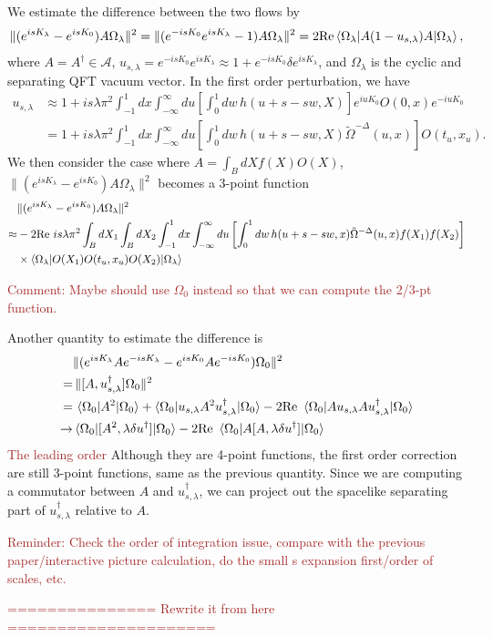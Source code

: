 \documentclass[a4paper,11pt]{article}
\theoremstyle{definition}
\newcommand{\KL}[1]{\textcolor{brown}{#1}}
\begin{document}
We estimate the difference between the two flows by
\begin{align}
    \lVert(e^{isK_\lambda} - e^{isK_0}) A\Omega_\lambda \rVert^2 = \lVert(e^{-isK_0}e^{isK_\lambda} - 1) A\Omega_\lambda \rVert^2 = 2 \text{Re}\braket{\Omega_\lambda|A(1-u_{s,\lambda})A|\Omega_\lambda},
\end{align}
where $A=A^\dagger \in \mathcal{A}$, $u_{s,\lambda} = e^{-isK_0}e^{isK_\lambda} \approx 1 + e^{-isK_0}\delta e^{isK_\lambda}$, and $\Omega_\lambda$ is the cyclic and separating QFT vacuum vector. In the first order perturbation, we have
\begin{align}
    u_{s,\lambda} &\approx 1 + is\lambda\pi^2 \int_{-1}^1 dx \int_{-\infty}^{\infty} du \left[\int_0^1 dw \, h(u+s-sw,X)\right] e^{iuK_0} O(0,x)  e^{-iuK_0}\\
    &=1+ is\lambda\pi^2 \int_{-1}^1 dx \int_{-\infty}^{\infty} du \left[\int_0^1 dw \, h(u+s-sw,X) \tilde{\Omega}^{-\Delta}(u,x) \right] O(t_u,x_u) .
\end{align}
We then consider the case where $A = \int_{B}dX f(X) O(X)$, $\lVert(e^{isK_\lambda} - e^{isK_0}) A\Omega_\lambda \rVert^2$ becomes a 3-point function
\begin{align}
    &\lVert(e^{isK_\lambda} - e^{isK_0}) A\Omega_\lambda \rVert^2\\ 
    \approx&  -2 \text{Re } is\lambda\pi^2 \int_{B}dX_1\int_{B}dX_2\int_{-1}^1 dx \int_{-\infty}^{\infty} du \left[\int_0^1 dw \, h(u+s-sw,x) \tilde{\Omega}^{-\Delta}(u,x) f(X_1)f(X_2) \right] \nonumber\\
    &\times \braket{\Omega_\lambda|O(X_1) O(t_u,x_u) O(X_2)|\Omega_\lambda}
\end{align}

\KL{Comment: Maybe should use $\Omega_0$ instead so that we can compute the 2/3-pt function.}

Another quantity to estimate the difference is
\begin{align}
    &\lVert(e^{isK_\lambda}Ae^{-isK_\lambda} - e^{isK_0} A e^{-isK_0})\Omega_0 \rVert^2 \\
    =&\, \lVert [A, u_{s,\lambda}^\dagger]\Omega_0 \rVert^2 \\
    =&\, \braket{\Omega_0|A^2|\Omega_0} + \braket{\Omega_0|u_{s,\lambda} A^2 u_{s,\lambda}^\dagger|\Omega_0} - 2\text{Re }\braket{\Omega_0|A u_{s,\lambda} A u_{s,\lambda}^\dagger|\Omega_0}\\
    \to &\braket{\Omega_0|[A^2, \lambda\delta u^\dagger]|\Omega_0} - 2\text{Re }\braket{\Omega_0|A[A, \lambda \delta u^\dagger]|\Omega_0}
\end{align}
\KL{The leading order}
Although they are 4-point functions, the first order correction are still 3-point functions, same as the previous quantity. Since we are computing a commutator between $A$ and $u_{s,\lambda}^\dagger$, we can project out the spacelike separating part of $u_{s,\lambda}^\dagger$ relative to $A$. 

\KL{Reminder: Check the order of integration issue, compare with the previous paper/interactive picture calculation, do the small s expansion first/order of scales, etc.}

\KL{=============== Rewrite it from here =====================}





\end{document}
